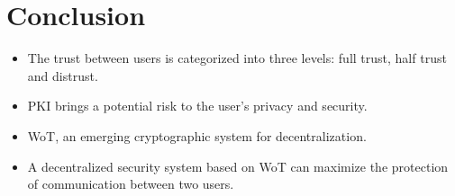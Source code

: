 \section{Conclusion}
\begin{frame}
    \begin{itemize}
        \item The trust between users is categorized into three 
        levels: full trust, half trust and distrust.
        \item PKI brings a potential risk to the user's privacy and security.
        \item WoT, an emerging cryptographic system for decentralization.
        \item A decentralized security system based on WoT can maximize the protection of 
        communication between two users.
    \end{itemize}
\end{frame}